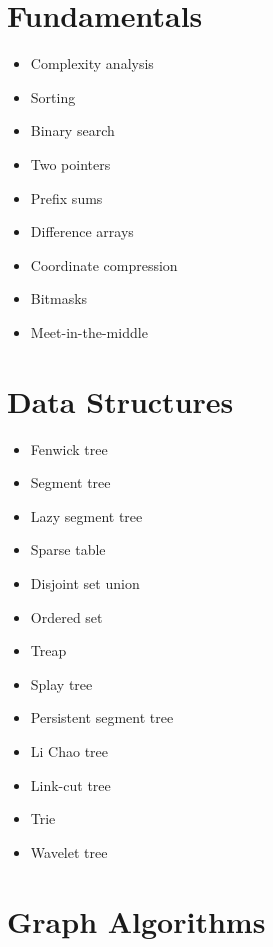\section*{Fundamentals}

\begin{itemize}
  \item Complexity analysis
  \item Sorting
  \item Binary search
  \item Two pointers
  \item Prefix sums
  \item Difference arrays
  \item Coordinate compression
  \item Bitmasks
  \item Meet-in-the-middle
\end{itemize}

\section*{Data Structures}

\begin{itemize}
  \item Fenwick tree
  \item Segment tree
  \item Lazy segment tree
  \item Sparse table
  \item Disjoint set union
  \item Ordered set
  \item Treap
  \item Splay tree
  \item Persistent segment tree
  \item Li Chao tree
  \item Link-cut tree
  \item Trie
  \item Wavelet tree
\end{itemize}

\section*{Graph Algorithms}


